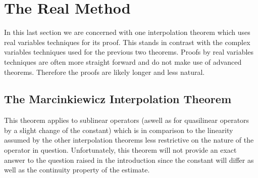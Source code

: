 \section{The Real Method}
In this last section we are concerned with one interpolation theorem which uses real variables techniques for its proof. This stands in contrast with the complex variables techniques used for the previous two theorems. Proofs by real variables techniques are often more straight forward and do not make use of advanced theorems. Therefore the proofs are likely longer and less natural.

\subsection{The Marcinkiewicz Interpolation Theorem}
This theorem applies to sublinear operators (aswell as for quasilinear operators by a slight change of the constant) which is in comparison to the linearity assumed by the other interpolation theorems less restrictive on the nature of the operator in question. Unfortunately, this theorem will not provide an exact answer to the question raised in the introduction since the constant will differ as well as the continuity property of the estimate.

\vspace{2mm}

